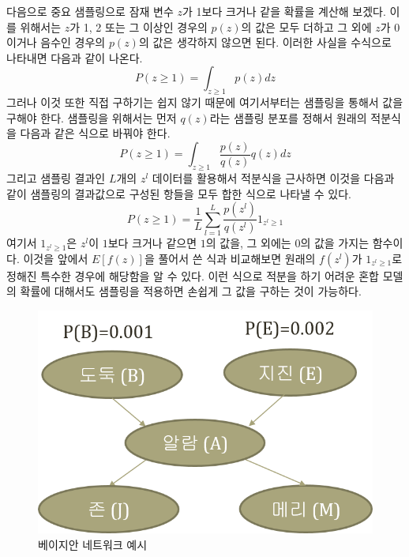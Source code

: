 \documentclass[a4paper]{oblivoir}
\begin{document}
다음으로 중요 샘플링으로 잠재 변수 $z$가 1보다 크거나 같을 확률을 계산해 보겠다. 이를 위해서는 $z$가 1, 2 또는 그 이상인 경우의 $p(z)$의 값은 모두 더하고 그 외에 $z$가 0이거나 음수인 경우의 $p(z)$의 값은 생각하지 않으면 된다. 이러한 사실을 수식으로 나타내면 다음과 같이 나온다.
\begin{equation}
P(z \geq 1) = \int_{z \geq 1} p(z)dz
\label{eq:10-2-3}
\end{equation} 
그러나 이것 또한 직접 구하기는 쉽지 않기 때문에 여기서부터는 샘플링을 통해서 값을 구해야 한다. 샘플링을 위해서는 먼저 $q(z)$라는 샘플링 분포를 정해서 원래의 적분식을 다음과 같은 식으로 바꿔야 한다. 
\begin{equation}
P(z \geq 1) = \int_{z \geq 1} \frac{p(z)}{q(z)} q(z) dz
\label{eq:10-2-4}
\end{equation} 
그리고 샘플링 결과인 $L$개의 $z^{l}$ 데이터를 활용해서 적분식을 근사하면 이것을 다음과 같이 샘플링의 결과값으로 구성된 항들을 모두 합한 식으로 나타낼 수 있다.
\begin{equation}
P(z \geq 1) = \frac{1}{L} \sum_{l=1}^{L} \frac{p(z^{l})}{q(z^{l})} 1_{z^{l} \geq 1}
\label{eq:10-2-5}
\end{equation} 
여기서 $1_{z^{l} \geq 1}$은 $z^{l}$이 $1$보다 크거나 같으면 $1$의 값을, 그 외에는 $0$의 값을 가지는 함수이다. 이것을 앞에서 $E[f(z)]$을 풀어서 쓴 식과 비교해보면 원래의 $f(z^{l})$가 $1_{z^{l} \geq 1}$로 정해진 특수한 경우에 해당함을 알 수 있다. 이런 식으로 적분을 하기 어려운 혼합 모델의 확률에 대해서도 샘플링을 적용하면 손쉽게 그 값을 구하는 것이 가능하다.   

\begin{figure}[ht] \centering 
\includegraphics[scale=0.6]{fig10_1.png} 
\caption{베이지안 네트워크 예시}
\label{fig:10-1-3}
\end{figure} 
\end{document}
